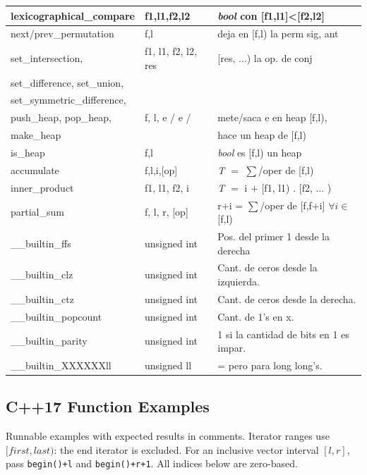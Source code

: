 \begin{tabular}{|l|l|p{5.4cm}|}
	lexicographical\_compare & f1,l1,f2,l2 & \textit{bool} con [f1,l1]<[f2,l2]\\\hline
	next/prev\_permutation & f,l & deja en [f,l) la perm sig, ant\\\hline
	set\_intersection, & f1, l1, f2, l2, res & [res, $\ldots$) la op. de conj\\
	set\_difference, set\_union, & & \\
	set\_symmetric\_difference, & &\\\hline
	push\_heap, pop\_heap, & f, l, e / e / & mete/saca e en heap [f,l), \\
	make\_heap & & hace un heap de [f,l)\\\hline
	is\_heap & f,l & \textit{bool} es [f,l) un heap\\\hline
	accumulate & f,l,i,[op] & \textit{T} $=$ $\sum$/oper de [f,l)\\\hline
	inner\_product & f1, l1, f2, i & \textit{T} $=$ i $+$ [f1, l1) . [f2, $\ldots$ )\\\hline
	partial\_sum & f, l, r, [op] & r+i = $\sum$/oper de [f,f+i] $\forall i \in$[f,l)\\\hline
	\_\_builtin\_ffs& unsigned int & Pos. del primer 1 desde la derecha\\\hline
	\_\_builtin\_clz & unsigned int & Cant. de ceros desde la izquierda.\\\hline
	\_\_builtin\_ctz & unsigned int & Cant. de ceros desde la derecha.\\\hline
	\_\_builtin\_popcount & unsigned int & Cant. de 1’s en x.\\\hline
	\_\_builtin\_parity & unsigned int & 1 si la cantidad de bits en 1 es impar.\\\hline
	\_\_builtin\_XXXXXXll & unsigned ll & = pero para long long's.\\\hline
\end{tabular}
\endgroup
\newpage


\centering
\begingroup
\raggedright
\subsection{C++17 Function Examples}
Runnable examples with expected results in comments. Iterator ranges
use $[first,last)$: the end iterator is excluded. For an inclusive
vector interval $[l,r]$, pass \texttt{begin()+l} and
\texttt{begin()+r+1}. All indices below are zero-based.

